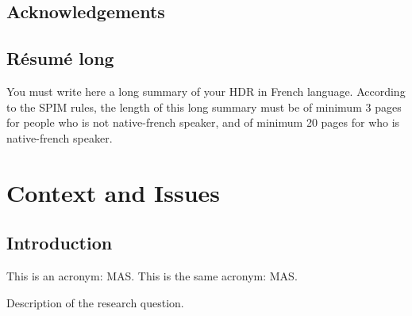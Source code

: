 \documentclass[english]{spimubehdr}
\begin{document}
\frontmatter

\chapter*{Acknowledgements}

\tableofcontents

\chapter*{R\'esum\'e long}

\begin{upmcaution}
	You must write here a long summary of your HDR in French language.
	According to the SPIM rules, the length of this long summary must be of minimum 3 pages for people who is not native-french speaker, and of minimum 20 pages for who is native-french speaker.
\end{upmcaution}


\printacronyms

\mainmatter

\part{Context and Issues}

\chapter{Introduction}

This is an acronym: \ac{MAS}.
This is the same acronym: \ac{MAS}.

\begin{researchquestion}[a name]
   Description of the research question.
\end{researchquestion}
\end{document}
